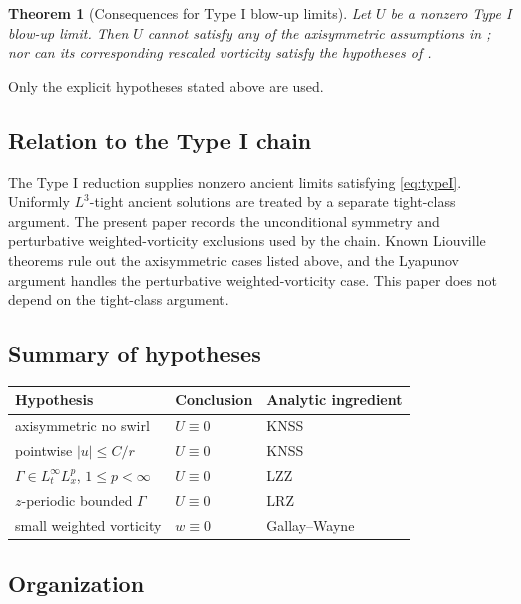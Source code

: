 \documentclass[11pt]{amsart}
\theoremstyle{plain}
\newtheorem{theorem}{Theorem}[section]
\theoremstyle{definition}
\theoremstyle{remark}
\numberwithin{equation}{section}
\begin{document}
\begin{theorem}[Consequences for Type I blow-up limits]
\label{thm:typeI-consequences}
Let \(U\) be a nonzero Type I blow-up limit.  Then \(U\) cannot satisfy any of
the axisymmetric assumptions in ; nor can its
corresponding rescaled vorticity satisfy the hypotheses of
.
\end{theorem}

Only the explicit hypotheses stated above are used.

\subsection{Relation to the Type I chain}

The Type I reduction supplies nonzero ancient limits satisfying
\eqref{eq:typeI}.  Uniformly \(L^3\)-tight ancient solutions are treated by a
separate tight-class argument.  The present paper records the unconditional
symmetry and perturbative weighted-vorticity exclusions used by the chain.
Known Liouville theorems rule out the axisymmetric cases listed above, and the
Lyapunov argument handles the perturbative weighted-vorticity case.  This
paper does not depend on the tight-class argument.

\subsection{Summary of hypotheses}

\begin{center}
\begin{tabular}{p{}p{}p{}}
\hline
Hypothesis & Conclusion & Analytic ingredient \\
\hline
axisymmetric no swirl & \(U\equiv0\) & KNSS \\
pointwise \(|u|\le C/r\) & \(U\equiv0\) & KNSS \\
\(\Gamma\in L_t^\infty L_x^p\), \(1\le p<\infty\) & \(U\equiv0\) & LZZ \\
\(z\)-periodic bounded \(\Gamma\) & \(U\equiv0\) & LRZ \\
small weighted vorticity & \(w\equiv0\) & Gallay--Wayne \\
\hline
\end{tabular}
\end{center}

\subsection{Organization}
\end{document}
